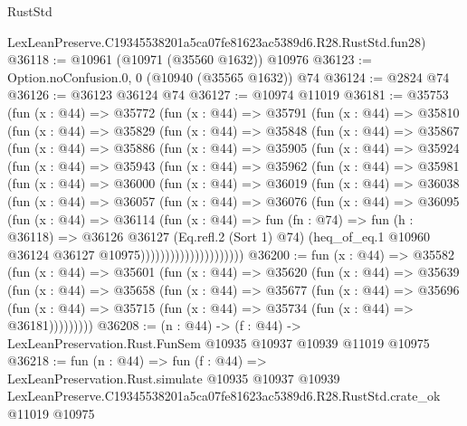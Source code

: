 \begin{lexlean}{RustStd}
\begin{coremodule}
    LexLeanPreserve.C19345538201a5ca07fe81623ac5389d6.R28.RustStd.fun28)
@36118 := @10961 (@10971 (@35560 @1632)) @10976
@36123 := Option.noConfusion.{0, 0} (@10940 (@35565 @1632)) @74
@36124 := @2824 @74
@36126 := @36123 @36124 @74
@36127 := @10974 @11019
@36181 := @35753
    (fun (x : @44) =>
    @35772
      (fun (x : @44) =>
      @35791
        (fun (x : @44) =>
        @35810
          (fun (x : @44) =>
          @35829
            (fun (x : @44) =>
            @35848
              (fun (x : @44) =>
              @35867
                (fun (x : @44) =>
                @35886
                  (fun (x : @44) =>
                  @35905
                    (fun (x : @44) =>
                    @35924
                      (fun (x : @44) =>
                      @35943
                        (fun (x : @44) =>
                        @35962
                          (fun (x : @44) =>
                          @35981
                            (fun (x : @44) =>
                            @36000
                              (fun (x : @44) =>
                              @36019
                                (fun (x : @44) =>
                                @36038
                                  (fun (x : @44) =>
                                  @36057
                                    (fun (x : @44) =>
                                    @36076
                                      (fun (x : @44) =>
                                      @36095
                                        (fun (x : @44) =>
                                        @36114
                                          (fun (x : @44) =>
                                          fun (fn : @74) =>
                                          fun (h : @36118) =>
                                          @36126
                                            @36127
                                            (Eq.refl.{2} (Sort 1) @74)
                                            (heq_of_eq.{1}
                                              @10960
                                              @36124
                                              @36127
                                              @10975)))))))))))))))))))))
@36200 := fun (x : @44) =>
  @35582
    (fun (x : @44) =>
    @35601
      (fun (x : @44) =>
      @35620
        (fun (x : @44) =>
        @35639
          (fun (x : @44) =>
          @35658
            (fun (x : @44) =>
            @35677
              (fun (x : @44) =>
              @35696
                (fun (x : @44) => @35715 (fun (x : @44) => @35734 (fun (x : @44) => @36181)))))))))
@36208 := (n : @44) ->
  (f : @44) -> LexLeanPreservation.Rust.FunSem @10935 @10937 @10939 @11019 @10975
@36218 := fun (n : @44) =>
  fun (f : @44) =>
  LexLeanPreservation.Rust.simulate
    @10935
    @10937
    @10939
    LexLeanPreserve.C19345538201a5ca07fe81623ac5389d6.R28.RustStd.crate_ok
    @11019
    @10975
\end{coremodule}
\end{lexlean}
